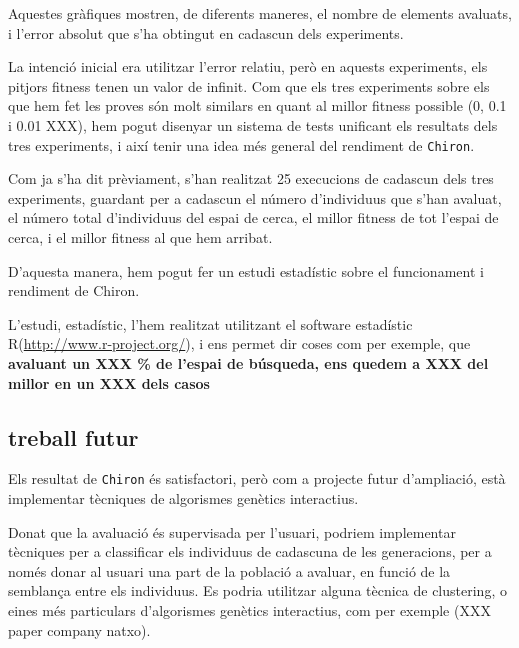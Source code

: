 \documentclass[titlepage,a4paper,12pt]{book}
\begin{document}
	Aquestes gràfiques mostren, de diferents maneres, el nombre de elements
	avaluats, i l'error absolut que s'ha obtingut en cadascun dels experiments.

	La intenció inicial era utilitzar l'error relatiu, però en aquests
	experiments, els pitjors fitness tenen un valor de infinit.  Com que els
	tres experiments sobre els que hem fet les proves són molt similars en quant
	al millor fitness possible (0, 0.1 i 0.01 XXX), hem pogut disenyar un
	sistema de tests unificant els resultats dels tres experiments, i així tenir
	una idea més general del rendiment de \texttt{Chiron}.

	Com ja s'ha dit prèviament, s'han  realitzat 25 execucions de cadascun dels
	tres experiments, guardant per a cadascun el número d'individuus que s'han
	avaluat, el número total d'individuus del espai de cerca, el millor fitness
	de tot l'espai de cerca, i el millor fitness al que hem arribat.

	D'aquesta manera, hem pogut fer un estudi estadístic sobre el funcionament i
	rendiment de Chiron.

	L'estudi, estadístic, l'hem realitzat utilitzant el software estadístic
	R(\url{http://www.r-project.org/}), i ens permet dir coses com per exemple, que \textbf{avaluant un XXX
	\% de l'espai de búsqueda, ens quedem a XXX del millor en un XXX dels casos}


\subsection{treball futur} %
	\label{sub:treball futur}

	Els resultat de \texttt{Chiron} és satisfactori, però com a projecte futur
	d'ampliació, està implementar tècniques de algorismes genètics interactius.

	Donat que la avaluació és supervisada per l'usuari, podriem implementar
	tècniques per a classificar els individuus de cadascuna de les generacions,
	per a només donar al usuari una part de la població a avaluar, en funció de
	la semblança entre els individuus.  Es podria utilitzar alguna tècnica de
	clustering, o eines més particulars d'algorismes genètics interactius, com
	per exemple (XXX paper company natxo).
	
\end{document}
